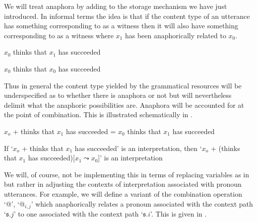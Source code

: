We will treat anaphora by adding to the storage mechanism we have just
introduced.  In informal terms the idea is that if the content type of
an utterance has something corresponding to  as a witness
then it will also have something corresponding to  as a
witness where $x_1$ has been anaphorically related to $x_0$.
\begin{ex} 
\begin{subex} 
 
\item $x_0$ thinks that $x_1$ has succeeded 
 
\item $x_0$ thinks that $x_0$ has succeeded 
 
\end{subex} 
   
\end{ex} 
Thus in general the content type yielded by the grammatical resources
will be underspecified as to whether there is anaphora or not but will
nevertheless delimit what the anaphoric possibilities are.  Anaphora
will be accounted for at the point of combination.  This is
illustrated schematically in \nexteg{}.
\begin{ex} 
\begin{subex} 
 
\item $x_o$ + thinks that $x_1$ has succeeded = $x_0$ thinks that
  $x_1$ has succeeded 
 
\item If `$x_o$ + thinks that $x_1$ has succeeded' is an
  interpretation, then `$x_o$ + (thinks that $x_1$ has
  succeeded)[$x_1\leadsto x_0$]' is an interpretation
 
\end{subex} 
   
\end{ex} 
We will, of course, not be implementing this in terms of replacing
variables as in \preveg{} but rather in adjusting the contexts of
interpretation associated with pronoun utterances.  For example, we
will define a variant of the combination operation `@', `@$_{i,j}$' which
anaphorically relates a pronoun associated with the context path
`$\mathfrak{s}.j$' to one associated with the context path
`$\mathfrak{s}.i$'.  This is given in \nexteg{}.

